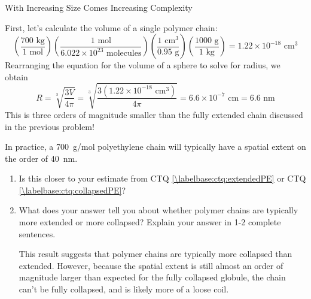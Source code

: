 \begin{activity}{With Increasing Size Comes Increasing Complexity}
\begin{ctqs}
		\begin{solution}[3.75in]
			First, let's calculate the volume of a single polymer chain:
			\begin{equation*}
				\left(\frac{700\text{ kg}}{1\text{ mol}}\right)
				\left(\frac{1\text{ mol}}{6.022\times10^{23}\text{ molecules}}\right)
				\left(\frac{1\text{ cm}^3}{0.95\text{ g}}\right)
				\left(\frac{1000\text{ g}}{1\text{ kg}}\right)
				= 1.22 \times 10^{-18}\text{ cm}^3
			\end{equation*}
			Rearranging the equation for the volume of a sphere to solve for radius, we obtain
			\begin{equation*}
				R=\sqrt[3]{\frac{3 V}{4\pi}} = \sqrt[3]{\frac{3 \left(1.22 \times 10^{-18}\text{ cm}^3\right)}{4\pi}} = 6.6 \times 10^{-7}\text{ cm} = 6.6\text{ nm}
			\end{equation*}
			This is three orders of magnitude smaller than the fully extended chain discussed in the previous problem!
		\end{solution}
		
	\question In practice, a 700~g/mol polyethylene chain will typically have a spatial extent on the order of 40~nm.  
	
		\begin{enumerate}
			\item Is this closer to your estimate from CTQ \ref{\labelbase:ctq:extendedPE} or CTQ \ref{\labelbase:ctq:collapsedPE}?
			
				\begin{solution}[0.5in]\end{solution}
			
			\item What does your answer tell you about whether polymer chains are typically more extended or more collapsed?  Explain your answer in 1-2 complete sentences.
			
				\begin{solution}[1.75in]
					This result suggests that polymer chains are typically more collapsed than extended.  However, because the spatial extent is still almost an order of magnitude larger than expected for the fully collapsed globule, the chain can't be fully collapsed, and is likely more of a loose coil.
				\end{solution}
			
		\end{enumerate}
		

\end{ctqs}
\end{activity}
